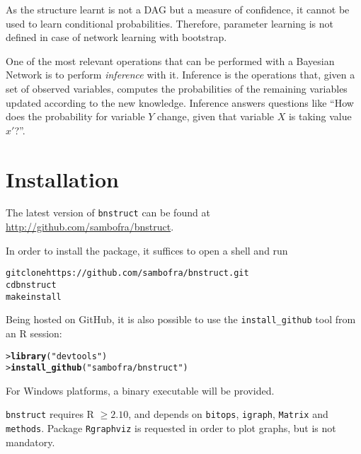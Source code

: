 \documentclass{article}\usepackage[]{graphicx}\usepackage[]{color}
\makeatletter
\newcommand{\hlstr}[1]{\textcolor[rgb]{0.192,0.494,0.8}{#1}}%
\newcommand{\hlstd}[1]{\textcolor[rgb]{0.345,0.345,0.345}{#1}}%
\newcommand{\hlkwd}[1]{\textcolor[rgb]{0.737,0.353,0.396}{\textbf{#1}}}%
\newenvironment{kframe}{%
 \def\at@end@of@kframe{}%
 \ifinner\ifhmode%
  \def\at@end@of@kframe{\end{minipage}}%
  \begin{minipage}{\columnwidth}%
 \fi\fi%
 \def\FrameCommand##1{\hskip\@totalleftmargin \hskip-\fboxsep
 \colorbox{shadecolor}{##1}\hskip-\fboxsep
     \hskip-\linewidth \hskip-\@totalleftmargin \hskip\columnwidth}%
 \MakeFramed {\advance\hsize-\width
   \@totalleftmargin\z@ \linewidth\hsize
   \@setminipage}}%
 {\par\unskip\endMakeFramed%
 \at@end@of@kframe}
\newenvironment{knitrout}{}{} %
\newcommand{\Rpackage}[1]{{\texttt{#1}}}
\makeatother
\begin{document}
As the structure learnt is not a DAG but a measure of confidence, it cannot be used to learn conditional probabilities.
Therefore, parameter learning is not defined in case of network learning with bootstrap.

One of the most relevant operations that can be performed with a Bayesian Network is to perform \emph{inference} with it.
Inference is the operations that, given a set of observed variables, computes the probabilities of the remaining variables
updated according to the new knowledge. Inference answers questions like ``How does the probability for variable
$Y$ change, given that variable $X$ is taking value $x\prime$?''.

\section{Installation}

The latest version of \Rpackage{bnstruct} can be found at \url{http://github.com/sambofra/bnstruct}.

In order to install the package, it suffices to open a shell and run
\begin{knitrout}
\color{fgcolor}\begin{kframe}
\begin{alltt}
git clone https://github.com/sambofra/bnstruct.git
cd bnstruct
make install
\end{alltt}
\end{kframe}
\end{knitrout}

Being hosted on GitHub, it is also possible to use the \texttt{install\_github} tool from
an R session:
\begin{knitrout}
\color{fgcolor}\begin{kframe}
\begin{alltt}
\hlstd{> }\hlkwd{library}\hlstd{(}\hlstr{"devtools"}\hlstd{)}
\hlstd{> }\hlkwd{install_github}\hlstd{(}\hlstr{"sambofra/bnstruct"}\hlstd{)}
\end{alltt}
\end{kframe}
\end{knitrout}

For Windows platforms, a binary executable will be provided.

\Rpackage{bnstruct} requires R $\geq 2.10$,
and depends on \Rpackage{bitops}, \Rpackage{igraph}, \Rpackage{Matrix} and \Rpackage{methods}.
Package \Rpackage{Rgraphviz} is requested in order to plot graphs, but is not mandatory.
\end{document}
